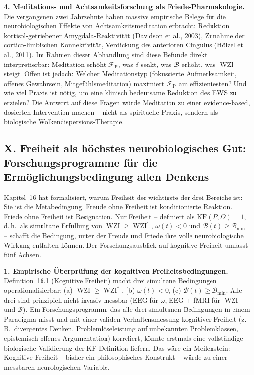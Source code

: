 ﻿\documentclass[12pt,a4paper]{report}
\theoremstyle{plain}
\theoremstyle{definition}
\theoremstyle{remark}
\DeclareMathOperator{\WZI}{WZI}
\begin{document}
	\textbf{4. Meditations- und Achtsamkeitsforschung als Friede-Pharmakologie.}
	Die vergangenen zwei Jahrzehnte haben massive empirische Belege
	für die neurobiologischen Effekte von Achtsamkeitsmeditation
	erbracht: Reduktion kortisol-getriebener Amygdala-Reaktivität
	(Davidson et al., 2003), Zunahme der cortico-limbischen
	Konnektivität, Verdickung des anterioren Cingulus
	(Hölzel et al., 2011).
	Im Rahmen dieser Abhandlung sind diese Befunde direkt
	interpretierbar: Meditation erhöht $\mathcal{F}_{\mathrm{P}}$,
	was $\delta$ senkt, was $\mathcal{B}$ erhöht, was $\WZI$ steigt.
	Offen ist jedoch: Welcher Meditationstyp (fokussierte
	Aufmerksamkeit, offenes Gewahrsein, Mitgefühlsmeditation)
	maximiert $\mathcal{F}_{\mathrm{P}}$ am effizientesten?
	Und wie viel Praxis ist nötig, um eine klinisch bedeutsame
	Reduktion des EWS zu erzielen?
	Die Antwort auf diese Fragen würde Meditation zu einer
	evidence-based, dosierten Intervention machen --
	nicht als spirituelle Praxis, sondern als biologische
	Wolkendispersions-Therapie.

	\subsection*{X. Freiheit als höchstes neurobiologisches Gut:
		Forschungsprogramme für die Ermöglichungsbedingung allen Denkens}

	Kapitel~16 hat formalisiert, warum Freiheit der wichtigste
	der drei Bereiche ist: Sie ist die Metabedingung.
	Freude ohne Freiheit ist konditionierte Reaktion.
	Friede ohne Freiheit ist Resignation.
	Nur Freiheit -- definiert als $\mathrm{KF}(P,\Omega) = 1$,
	d.\,h.\ als simultane Erfüllung von $\WZI \geq \WZI^*$,
	$\omega(t) < 0$ und $\mathcal{B}(t) \geq \mathcal{B}_{\min}$ --
	schafft die Bedingung, unter der Freude und Friede ihre volle
	neurobiologische Wirkung entfalten können.
	Der Forschungsausblick auf kognitive Freiheit umfasst fünf Achsen.

	\textbf{1. Empirische Überprüfung der kognitiven Freiheitsbedingungen.}
	Definition~16.1 (Kognitive Freiheit) macht drei simultane Bedingungen
	operationalisierbar: (a) $\WZI \geq \WZI^*$, (b) $\omega(t) < 0$,
	(c) $\mathcal{B}(t) \geq \mathcal{B}_{\min}$.
	Alle drei sind prinzipiell nicht-invasiv messbar (EEG für $\omega$,
	EEG + fMRI für $\WZI$ und $\mathcal{B}$).
	Ein Forschungsprogramm, das alle drei simultanen Bedingungen in
	einem Paradigma misst und mit einer validen Verhaltensmessung
	kognitiver Freiheit (z.\,B.\ divergentes Denken, Problemlöseleistung
	auf unbekannten Problemklassen, epistemisch offenes Argumentation)
	korreliert, könnte erstmals eine vollständige biologische
	Validierung der KF-Definition liefern.
	Das wäre ein Meilenstein: Kognitive Freiheit -- bisher ein
	philosophisches Konstrukt -- würde zu einer messbaren
	neurologischen Variable.
\end{document}

